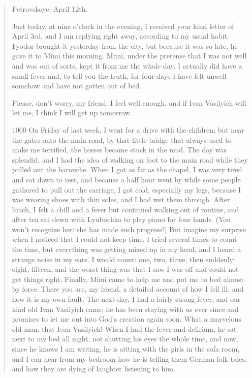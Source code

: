\begin{quotation}
\begin{flushright}
Petrovskoye. April 12th.
\end{flushright}

Just today, at nine o'clock in the evening, I received your kind letter of April 3rd, and I am replying right away, according to my usual habit. Fyodor brought it yesterday from the city, but because it was so late, he gave it to Mimi this morning. Mimi, under the pretense that I was not well and was out of sorts, kept it from me the whole day. I actually did have a small fever and, to tell you the truth, for four days I have felt unwell somehow and have not gotten out of bed.

Please, don't worry, my friend: I feel well enough, and if Ivan Vasilyich will let me, I think I will get up tomorrow.

\begin{tolerant}{1000}
On Friday of last week, I went for a drive with the children; but near the gates onto the main road, by that little bridge that always used to make me terrified, the horses became stuck in the mud. The day was splendid, and I had the idea of walking on foot to the main road while they pulled out the barouche. When I got as far as the chapel, I was very tired and sat down to rest, and because a half hour went by while some people gathered to pull out the carriage, I got cold, especially my legs, because I was wearing shoes with thin soles, and I had wet them through. After lunch, I felt a chill and a fever but continued walking out of routine, and after tea sat down with Lyubochka to play piano for four hands. (You won't recognize her: she has made such progress!) But imagine my surprise when I noticed that I could not keep time. I tried several times to count the time, but everything was getting mixed up in my head, and I heard a strange noise in my ears. I would count: one, two, three, then suddenly: eight, fifteen, and the worst thing was that I saw I was off and could not get things right. Finally, Mimi came to help me and put me to bed almost by force. There you are, my friend, a detailed account of how I fell ill, and how it is my own fault. The next day, I had a fairly strong fever, and our kind old Ivan Vasilyich came; he has been staying with us ever since and promises to let me out into God's creation again soon. What a marvelous old man, that Ivan Vasilyich! When I had the fever and delirium, he sat next to my bed all night, not shutting his eyes the whole time, and now, since he knows I am writing, he is sitting with the girls in the sofa room, and I can hear from my bedroom how he is telling them German folk tales, and how they are dying of laughter listening to him.
\end{tolerant}


\end{quotation}
